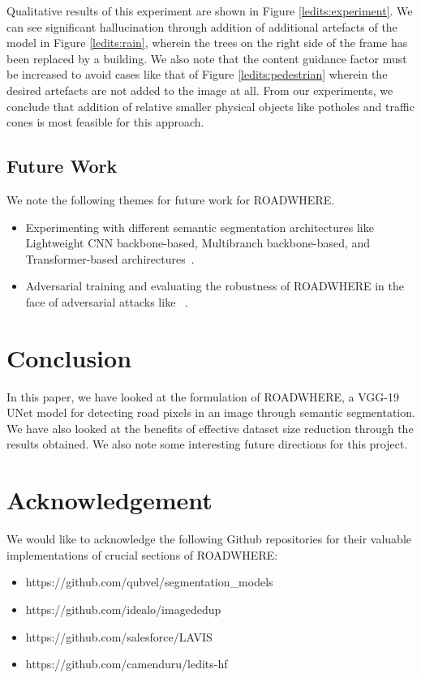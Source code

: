 \documentclass[letterpaper, 10 pt, conference]{ieeeconf}  %
\begin{document}
Qualitative results of this experiment are shown in Figure \ref{ledits:experiment}. We can see significant hallucination through addition of additional artefacts of the model in Figure \ref{ledits:rain}, wherein the trees on the right side of the frame has been replaced by a building. We also note that the content guidance factor must be increased to avoid cases like that of Figure \ref{ledits:pedestrian} wherein the desired artefacts are not added to the image at all. From our experiments, we conclude that addition of relative smaller physical objects like potholes and traffic cones is most feasible for this approach.

\subsection{Future Work}
\label{discussion:future}
We note the following themes for future work for ROADWHERE.
\begin{itemize}
    \item Experimenting with different semantic segmentation architectures like Lightweight CNN backbone-based, Multibranch backbone-based, and Transformer-based archirectures~\cite{Cheng2023}.
    \item Adversarial training and evaluating the robustness of ROADWHERE in the face of adversarial attacks like ~\cite{9956276}.
\end{itemize}


\section{Conclusion}
\label{conclusion}
In this paper, we have looked at the formulation of ROADWHERE, a VGG-19 UNet model for detecting road pixels in an image through semantic segmentation. We have also looked at the benefits of effective dataset size reduction through the results obtained. We also note some interesting future directions for this project.

\section{Acknowledgement}
\label{ack}
We would like to acknowledge the following Github repositories for their valuable implementations of crucial sections of ROADWHERE:
\begin{itemize}
    \item https://github.com/qubvel/segmentation\_models
    \item https://github.com/idealo/imagededup
    \item https://github.com/salesforce/LAVIS
    \item https://github.com/camenduru/ledits-hf
\end{itemize}

\balance



\end{document}
